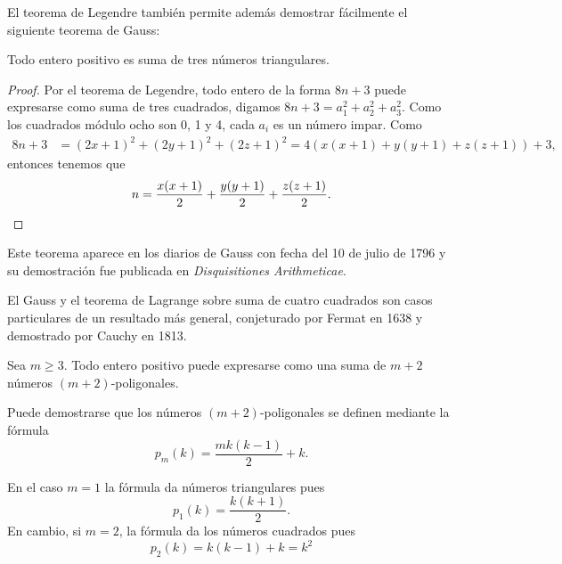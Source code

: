 


El teorema de Legendre también permite además demostrar fácilmente el siguiente
teorema de Gauss:

\begin{theorem}[Gauss]
	Todo entero positivo es suma de tres números triangulares.
\end{theorem}

\begin{proof}
	Por el teorema de Legendre, todo entero de la forma $8n+3$ puede expresarse
	como suma de tres cuadrados, digamos $8n+3=a_1^2+a_2^2+a_3^2$. Como los
	cuadrados módulo ocho son 0, 1 y 4, cada $a_i$ es un número impar. Como 
	\begin{align*}
		8n+3&=(2x+1)^2+(2y+1)^2+(2z+1)^2
		=4(x(x+1)+y(y+1)+z(z+1))+3,
	\end{align*}
	entonces tenemos que 
	\[
		n=\frac{x(x+1)}{2}+\frac{y(y+1)}{2}+\frac{z(z+1)}{2}.\qedhere
	\]
\end{proof}

Este teorema aparece en los diarios de Gauss con fecha del 10 de julio de 1796
y su demostración fue publicada en \emph{Disquisitiones Arithmeticae}.  

El Gauss y el teorema de Lagrange sobre suma de cuatro cuadrados son
casos particulares de un resultado más general, conjeturado por Fermat en 1638
y demostrado por Cauchy en 1813. 

\begin{theorem}[Cauchy]
\label{thm:Cauchy}
    Sea $m\geq3$. Todo entero positivo puede
    expresarse como una suma de $m+2$ números $(m+2)$-poligonales.
\end{theorem}

Puede demostrarse que los números
$(m+2)$-poligonales se definen mediante la fórmula
\[
	p_m(k)=\frac{mk(k-1)}{2}+k.
\]

En el caso $m=1$ la fórmula da números triangulares pues
\[
	p_1(k)=\frac{k(k+1)}{2}.
\]
En cambio, si 
$m=2$, la fórmula da los números cuadrados pues
\[
p_2(k)=k(k-1)+k=k^2
\]

